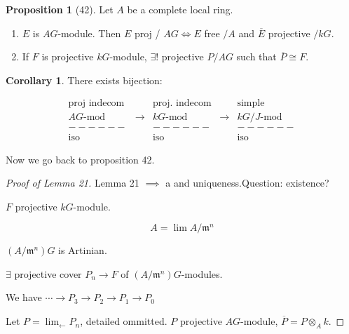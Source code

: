 \documentclass{article}
\theoremstyle{definition}
\newtheorem{proposition}[theorem]{Proposition}
\newtheorem{corollary}[theorem]{Corollary}
\begin{document}
\begin{proposition}
    [42] Let \(A\) be a complete local ring.

    \begin{enumerate}[label=\alph*)]
        \item \(E\) is \(AG\)-module. Then \(E\) proj / \(AG \iff E\) free \(/A\) and \(\overline{E}\) projective \(/ kG\).
        \item If \(F\) is projective \(kG\)-module, \(\exists !\) projective \(P / A G\) such that \(\overline{P} \cong F\).
    \end{enumerate} 
\end{proposition}

\begin{corollary}
    There exists bijection:

    \[
        \begin{matrix}
             \text{proj indecom} & & \text{proj. indecom} & & \text{simple} \\
             AG\text{-mod} & \to & kG\text{-mod} & \to & kG/J\text{-mod} \\ - - - - - - & & - - - - - - & & - - - - - - \\
             \text{iso} & & \text{iso} & & \text{iso}
        \end{matrix}
    \]
\end{corollary}

Now we go back to proposition 42.

\begin{proof}
    [Proof of Lemma 21] Lemma 21 \(\implies\) a and uniqueness.Question: existence?

    \(F\) projective \(kG\)-module.

    \[
        A = \lim A / \mathfrak{m}^n
    \]

    \((A / \mathfrak{m}^n)G\) is Artinian.
    
    \(\exists \) projective cover \(P_n \to F\) of \((A / \mathfrak{m}^n)G\)-modules.
    
    \begin{center}
    \end{center}

    We have \(\cdots \to P_3 \to P_2 \to P_1 \to P_0\)
    
    Let \(P = \lim_{\leftarrow} P_n\), detailed ommitted. \(P\) projective \(AG\)-module, \(\overline{P} = P \otimes_A k\).  
\end{proof}
\end{document}
